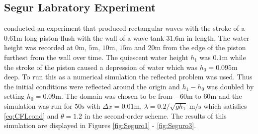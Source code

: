 \documentclass[SingleSpace,12pt,Proceedings]{Serre_ASCE}
\begin{document}
\subsection{Segur Labratory Experiment}\label{Laboratory_Experiments}
 conducted an experiment that produced rectangular waves with the stroke of a $0.61\text{m}$ long piston flush with the wall of a wave tank $31.6\text{m}$ in length. The water height was recorded at $0\text{m}$, $5\text{m}$, $10\text{m}$, $15\text{m}$ and $20\text{m}$ from the edge of the piston furthest from the wall over time. The quiescent water height $h_1$ was $0.1\text{m}$ while the stroke of the piston caused a depression of water which was $h_0 = 0.095\text{m}$ deep. To run this as a numerical simulation the reflected problem was used. Thus the initial conditions were reflected around the origin and $h_1 - h_0$ was doubled by setting $h_0 = 0.09\text{m}$. The domain was chosen to be from $-60\text{m}$ to $60\text{m}$ and the simulation was run for $50\text{s}$ with $\Delta x = 0.01 \text{m}$, $\lambda = 0.2/\sqrt{g h_1} \; \text{m/s}$ which satisfies \eqref{eq:CFLcond} and $\theta = 1.2$ in the second-order scheme. The results of this simulation are displayed in Figures \ref{fig:Seguro1} - \ref{fig:Seguro3}.
\end{document}
